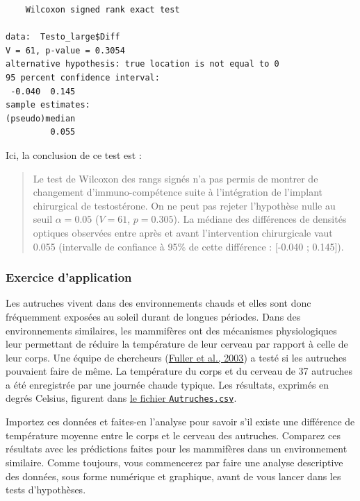 \documentclass[
  a4paper,
]{article}
\begin{document}
\begin{verbatim}
    Wilcoxon signed rank exact test

data:  Testo_large$Diff
V = 61, p-value = 0.3054
alternative hypothesis: true location is not equal to 0
95 percent confidence interval:
 -0.040  0.145
sample estimates:
(pseudo)median 
         0.055 
\end{verbatim}

Ici, la conclusion de ce test est :

\begin{quote}
Le test de Wilcoxon des rangs signés n'a pas permis de montrer de changement d'immuno-compétence suite à l'intégration de l'implant chirurgical de testostérone. On ne peut pas rejeter l'hypothèse nulle au seuil \(\alpha = 0.05\) (\(V = 61\), \(p = 0.305\)). La médiane des différences de densités optiques observées entre après et avant l'intervention chirurgicale vaut 0.055 (intervalle de confiance à 95\% de cette différence : {[}-0.040 ; 0.145{]}).
\end{quote}

\hypertarget{exercice-dapplication-1}{%
\subsubsection{Exercice d'application}\label{exercice-dapplication-1}}

Les autruches vivent dans des environnements chauds et elles sont donc fréquemment exposées au soleil durant de longues périodes. Dans des environnements similaires, les mammifères ont des mécanismes physiologiques leur permettant de réduire la température de leur cerveau par rapport à celle de leur corps. Une équipe de chercheurs (\protect\hyperlink{ref-Fuller2003}{Fuller et al., 2003}) a testé si les autruches pouvaient faire de même. La température du corps et du cerveau de 37 autruches a été enregistrée par une journée chaude typique. Les résultats, exprimés en degrés Celsius, figurent dans \href{https://besibo.github.io/Biometrie3/data/Autruches.csv}{le fichier \texttt{Autruches.csv}}.

Importez ces données et faites-en l'analyse pour savoir s'il existe une différence de température moyenne entre le corps et le cerveau des autruches. Comparez ces résultats avec les prédictions faites pour les mammifères dans un environnement similaire. Comme toujours, vous commencerez par faire une analyse descriptive des données, sous forme numérique et graphique, avant de vous lancer dans les tests d'hypothèses.
\end{document}
